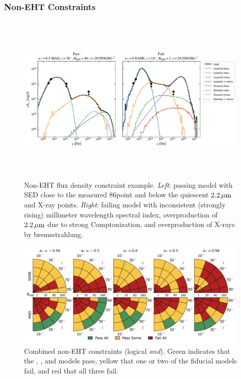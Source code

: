 \subsubsection{Non-EHT Constraints}

\begin{figure}[h!]
  \centering
  \includegraphics[height=3.25in]{figures/passfail_sed.pdf}
  \caption{%
    Non-EHT flux density constraint example.
    \emph{Left}: passing model with SED close to the measured 86\GHz point and below the quiescent $2.2\,\mu\mathrm{m}$ and X-ray points.
    \emph{Right}: failing model with inconsistent (strongly rising) millimeter wavelength spectral index, overproduction of $2.2\,\mu\mathrm{m}$ due to strong Comptonization, and overproduction of X-rays by bremsstrahlung.}
  \label{fig:passfail_sed}
\end{figure}

\begin{figure}
  \centering
  \includegraphics[width=\textwidth]{./figures/Non_Interferometric_Constraints.png}
  \caption{Combined non-EHT constraints (logical {\em and}).
    Green indicates that the \kharma, \bhac, and \hamr models pass, yellow that one or two of the fiducial models fail, and red that all three fail.}
  \label{fig:non_eht_cuts}
\end{figure}

